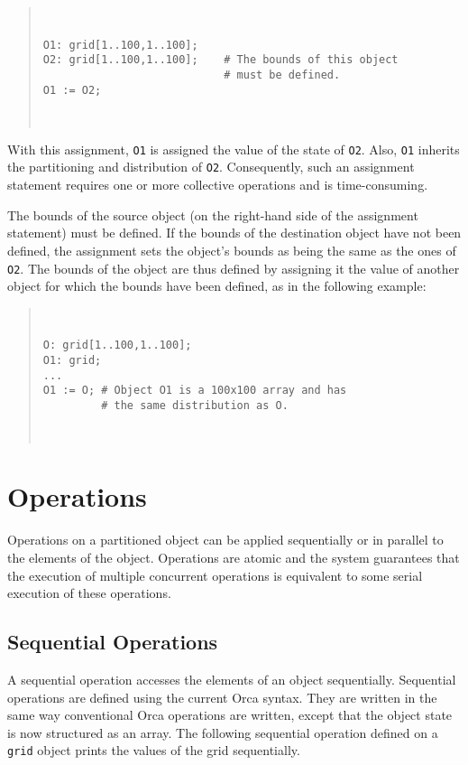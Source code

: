 \documentclass{article}
\newenvironment{example}
  {\begin{quote} ~\hrulefill }
  {~\hrulefill \end{quote} }
\begin{document}
\begin{example} \begin{verbatim}
O1: grid[1..100,1..100];
O2: grid[1..100,1..100];    # The bounds of this object 
                            # must be defined.
O1 := O2;
\end{verbatim} 
\end{example}

With this assignment, \verb+O1+ is assigned the value of the state of
\verb+O2+. Also, \verb+O1+ inherits the partitioning and distribution
of \verb+O2+. Consequently, such an assignment statement requires one
or more collective operations and is time-consuming.

The bounds of the source object (on the right-hand side of the
assignment statement) must be defined. If the bounds of the
destination object have not been defined, the assignment sets the
object's bounds as being the same as the ones of \verb+O2+. The bounds
of the object are thus defined by assigning it the value of another
object for which the bounds have been defined, as in the following
example:

\begin{example} \begin{verbatim}
O: grid[1..100,1..100];
O1: grid;
...
O1 := O; # Object O1 is a 100x100 array and has
         # the same distribution as O.
\end{verbatim} 
\end{example}

\section{Operations}
\label{operations}

Operations on a partitioned object can be applied sequentially or in
parallel to the elements of the object. Operations are atomic and the
system guarantees that the execution of multiple concurrent
operations is equivalent to some serial execution of these operations.

\subsection{Sequential Operations}

A sequential operation accesses the elements of an object
sequentially.  Sequential operations are defined using the current
Orca syntax. They are written in the same way conventional Orca
operations are written, except that the object state is now structured
as an array. The following sequential operation defined on a
\verb+grid+ object prints the values of the grid sequentially.
\end{document}
